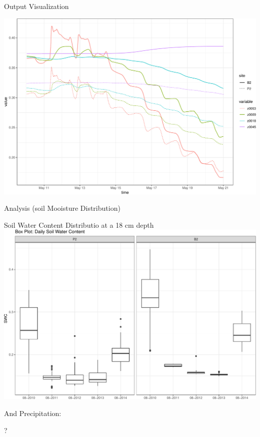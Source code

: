 \documentclass[ignorenonframetext,]{beamer}
\begin{document}
\begin{frame}{Output Visualization}

\includegraphics{presentation_files/figure-beamer/unnamed-chunk-10-1.pdf}

\end{frame}

\begin{frame}{Analysis (soil Mooisture Distribution)}

Soil Water Content Distributio at a 18 cm depth
\includegraphics{presentation_files/figure-beamer/unnamed-chunk-11-1.pdf}

\end{frame}

\begin{frame}{And Precipitation:}

?

\end{frame}
\end{document}
